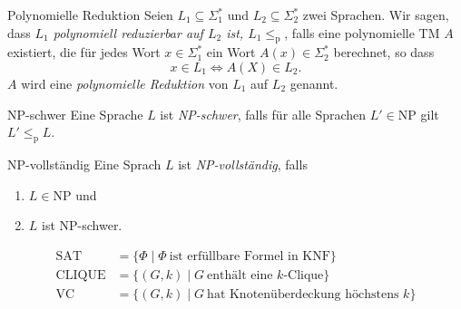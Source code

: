 \documentclass[a4paper,10pt]{article}
\begin{document}
\begin{subbox}{Polynomielle Reduktion}
    Seien $L_1 \subseteq \Sigma_1^*$ und $L_2 \subseteq \Sigma_2^*$ zwei Sprachen. Wir sagen, dass \emph{$L_1$ polynomiell reduzierbar auf $L_2$ ist, $L_1 \leq_\textrm{p}$}, falls eine polynomielle TM $A$ existiert, die für jedes Wort $x \in \Sigma_1^*$ ein Wort $A(x) \in \Sigma_2^*$ berechnet, so dass
    \[x \in L_1 \iff A(X) \in L_2 \text{.}\]
    $A$ wird eine \emph{polynomielle Reduktion} von $L_1$ auf $L_2$ genannt.
\end{subbox}
\begin{mainbox}{NP-schwer}
    Eine Sprache $L$ ist \emph{NP-schwer}, falls für alle Sprachen $L' \in \textrm{NP}$ gilt $L' \leq_\textrm{p} L$.
\end{mainbox}
\begin{mainbox}{NP-vollständig}
    Eine Sprach $L$ ist \emph{NP-vollständig}, falls
    \begin{enumerate}
        \item $L \in \textrm{NP}$ und
        \item $L$ ist NP-schwer.
    \end{enumerate}
\end{mainbox}
\begin{align*}
    \textrm{SAT} &= \{\Phi \;|\; \Phi\ \text{ist erfüllbare Formel in KNF}\}\\
    \textrm{CLIQUE} &= \{(G, k) \;|\; G\ \text{enthält eine $k$-Clique}\}\\
    \textrm{VC} &= \{(G, k) \;|\; G\ \text{hat Knotenüberdeckung höchstens $k$}\}
\end{align*}
\end{document}
